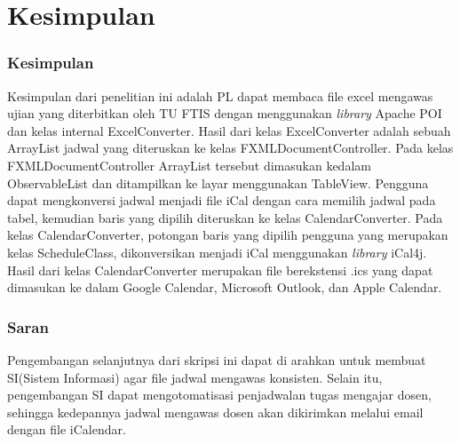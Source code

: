 \chapter{Kesimpulan}
\label{chap:summary}

\subsection{Kesimpulan}

Kesimpulan dari penelitian ini adalah PL dapat membaca file excel mengawas ujian yang diterbitkan oleh TU FTIS dengan menggunakan \textit{library} Apache POI dan kelas internal ExcelConverter. Hasil dari kelas ExcelConverter adalah sebuah ArrayList jadwal yang diteruskan ke kelas FXMLDocumentController. Pada kelas FXMLDocumentController ArrayList tersebut dimasukan kedalam ObservableList dan ditampilkan ke layar menggunakan TableView. Pengguna dapat mengkonversi jadwal menjadi file iCal dengan cara memilih jadwal pada tabel, kemudian baris yang dipilih diteruskan ke kelas CalendarConverter. Pada kelas CalendarConverter, potongan baris yang dipilih pengguna yang merupakan kelas ScheduleClass, dikonversikan menjadi iCal menggunakan \textit{library} iCal4j. Hasil dari kelas CalendarConverter merupakan file berekstensi .ics yang dapat dimasukan ke dalam Google Calendar, Microsoft Outlook, dan Apple Calendar.       
 
\subsection{Saran}
Pengembangan selanjutnya dari skripsi ini dapat di arahkan untuk membuat SI(Sistem Informasi) agar file jadwal mengawas konsisten. Selain itu, pengembangan SI dapat mengotomatisasi penjadwalan tugas mengajar dosen, sehingga kedepannya jadwal mengawas dosen akan dikirimkan melalui email dengan file iCalendar. 